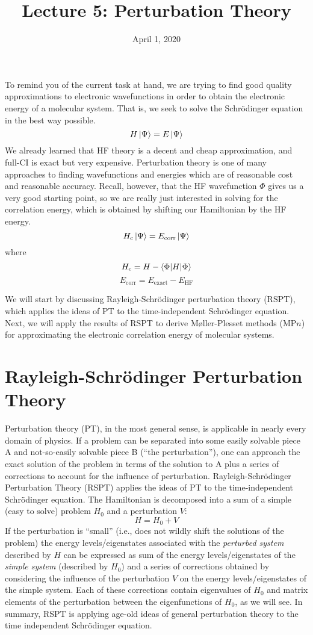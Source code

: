 \documentclass{article}
\title{Lecture 5: Perturbation Theory}
\date{April 1, 2020}
\newcommand{\Ecorr}{E_{\mathrm{corr}}}
\newcommand{\Hc}{H_{\mathrm{c}}}
\begin{document}
\maketitle
\noindent
To remind you of the current task at hand, we are trying to find good quality approximations 
    to electronic wavefunctions in order to obtain the electronic energy of a molecular system. 
That is, we seek to solve the Schr{\"o}dinger equation in the best way possible.
\[H \ket{\Psi} = E \ket{\Psi} \]
We already learned that HF theory is a decent and cheap approximation, and full-CI is exact but very expensive. 
Perturbation theory is one of many approaches to finding wavefunctions and energies which are of 
    reasonable cost and reasonable accuracy.
Recall, however, that the HF wavefunction $\Phi$ gives us a very good starting point, so we are really just interested in solving for the correlation energy,
which is obtained by shifting our Hamiltonian by the HF energy.
\[\Hc \ket{\Psi} = \Ecorr \ket{\Psi} \]
where 
\[\Hc = H - \braket{\Phi| H | \Phi} \]
\[\Ecorr = E_{\mathrm{exact}} - E_{\mathrm{HF}}\]

We will start by discussing Rayleigh-Schr{\"o}dinger perturbation theory (RSPT), which applies the ideas of PT to the time-independent 
    Schr{\"o}dinger equation.
Next, we will apply the results of RSPT to derive M{\o}ller-Plesset methods (MP$n$) for approximating the electronic correlation energy of molecular systems. 

\section{Rayleigh-Schr{\"o}dinger Perturbation Theory}
Perturbation theory (PT), in the most general sense, is applicable in nearly every domain of physics. 
If a problem can be separated into some easily solvable piece A and not-so-easily solvable piece B 
    (``the perturbation''), one can approach the exact solution of the problem in terms of the solution to A 
    plus a series of corrections to account for the influence of perturbation.
Rayleigh-Schr{\"o}dinger Perturbation Theory (RSPT) applies the ideas of PT to the time-independent 
    Schr{\"o}dinger equation.
The Hamiltonian is decomposed into a sum of a simple (easy to solve) problem $H_0$ and a perturbation $V$:
\[H = H_0 + V \]
If the perturbation is ``small'' (i.e., does not wildly shift the solutions of the problem) the 
    energy levels/eigenstates associated with the \textit{perturbed system} described by $H$ can be expressed 
    as sum of the energy levels/eigenstates of  the \textit{simple system} (described by $H_0$) and a series 
    of corrections obtained by considering the influence of the perturbation $V$ on the 
    energy levels/eigenstates of the simple system.
Each of these corrections contain eigenvalues of $H_0$ and matrix elements of the perturbation 
    between the eigenfunctions of $H_0$, as we will see.
In summary, RSPT is applying age-old ideas of general perturbation theory to the
    time independent Schr{\"o}dinger equation.
\end{document}
